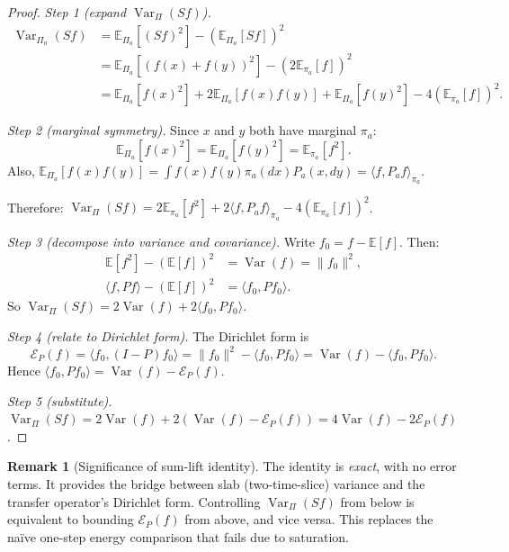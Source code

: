 \documentclass[12pt]{article}
\theoremstyle{plain}
\theoremstyle{definition}
\newtheorem{remark}[theorem]{Remark}
\numberwithin{equation}{section}
\newcommand{\Var}{\operatorname{Var}}
\begin{document}
\begin{proof}
\emph{Step 1 (expand $\Var_\Pi(Sf)$).}
\begin{align}
\Var_{\Pi_a}(Sf) &= \mathbb{E}_{\Pi_a}[(Sf)^2]-(\mathbb{E}_{\Pi_a}[Sf])^2\\
&= \mathbb{E}_{\Pi_a}[(f(x)+f(y))^2]-(2\mathbb{E}_{\pi_a}[f])^2\\
&= \mathbb{E}_{\Pi_a}[f(x)^2]+2\mathbb{E}_{\Pi_a}[f(x)f(y)]+\mathbb{E}_{\Pi_a}[f(y)^2]-4(\mathbb{E}_{\pi_a}[f])^2.
\end{align}

\emph{Step 2 (marginal symmetry).}  Since $x$ and $y$ both have marginal $\pi_a$:
\begin{equation}
\mathbb{E}_{\Pi_a}[f(x)^2]=\mathbb{E}_{\Pi_a}[f(y)^2]=\mathbb{E}_{\pi_a}[f^2].
\end{equation}
Also, $\mathbb{E}_{\Pi_a}[f(x)f(y)]=\int f(x)f(y)\pi_a(dx)P_a(x,dy)=\langle f,P_a f\rangle_{\pi_a}$.

Therefore: $\Var_\Pi(Sf)=2\mathbb{E}_{\pi_a}[f^2]+2\langle f,P_a f\rangle_{\pi_a}-4(\mathbb{E}_{\pi_a}[f])^2$.

\emph{Step 3 (decompose into variance and covariance).}  Write $f_0=f-\mathbb{E}[f]$.  Then:
\begin{align}
\mathbb{E}[f^2]-(\mathbb{E}[f])^2 &= \Var(f)=\|f_0\|^2,\\
\langle f,Pf\rangle-(\mathbb{E}[f])^2 &= \langle f_0,Pf_0\rangle.
\end{align}
So $\Var_\Pi(Sf)=2\Var(f)+2\langle f_0,Pf_0\rangle$.

\emph{Step 4 (relate to Dirichlet form).}  The Dirichlet form is
\begin{equation}
\mathcal{E}_P(f)=\langle f_0,(I-P)f_0\rangle=\|f_0\|^2-\langle f_0,Pf_0\rangle=\Var(f)-\langle f_0,Pf_0\rangle.
\end{equation}
Hence $\langle f_0,Pf_0\rangle=\Var(f)-\mathcal{E}_P(f)$.

\emph{Step 5 (substitute).}  $\Var_\Pi(Sf)=2\Var(f)+2(\Var(f)-\mathcal{E}_P(f))=4\Var(f)-2\mathcal{E}_P(f)$.
\end{proof}

\begin{remark}[Significance of sum-lift identity]
The identity is \emph{exact}, with no error terms.  It provides the bridge between slab (two-time-slice) variance and the transfer operator's Dirichlet form.  Controlling $\Var_\Pi(Sf)$ from below is equivalent to bounding $\mathcal{E}_P(f)$ from above, and vice versa.  This replaces the na\"ive one-step energy comparison that fails due to saturation.
\end{remark}
\end{document}
